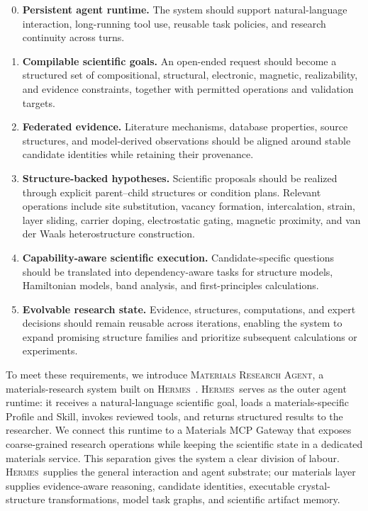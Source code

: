 \documentclass[11pt]{article}
\newcommand{\system}{\textsc{Materials Research Agent}}
\newcommand{\hermes}{\textsc{Hermes}}
\begin{document}
\begin{enumerate}[leftmargin=1.75em,label=\textbf{R\arabic*.},itemsep=0.45em]
    \setcounter{enumi}{-1}
    \item \textbf{Persistent agent runtime.}
    The system should support natural-language interaction, long-running tool use, reusable task policies, and research continuity across turns.

    \item \textbf{Compilable scientific goals.}
    An open-ended request should become a structured set of compositional, structural, electronic, magnetic, realizability, and evidence constraints, together with permitted operations and validation targets.

    \item \textbf{Federated evidence.}
    Literature mechanisms, database properties, source structures, and model-derived observations should be aligned around stable candidate identities while retaining their provenance.

    \item \textbf{Structure-backed hypotheses.}
    Scientific proposals should be realized through explicit parent--child structures or condition plans. Relevant operations include site substitution, vacancy formation, intercalation, strain, layer sliding, carrier doping, electrostatic gating, magnetic proximity, and van der Waals heterostructure construction.

    \item \textbf{Capability-aware scientific execution.}
    Candidate-specific questions should be translated into dependency-aware tasks for structure models, Hamiltonian models, band analysis, and first-principles calculations.

    \item \textbf{Evolvable research state.}
    Evidence, structures, computations, and expert decisions should remain reusable across iterations, enabling the system to expand promising structure families and prioritize subsequent calculations or experiments.
\end{enumerate}

To meet these requirements, we introduce \system, a materials-research system built on \hermes\ \cite{nousresearch2026hermes}. \hermes\ serves as the outer agent runtime: it receives a natural-language scientific goal, loads a materials-specific Profile and Skill, invokes reviewed tools, and returns structured results to the researcher. We connect this runtime to a Materials MCP Gateway that exposes coarse-grained research operations while keeping the scientific state in a dedicated materials service. This separation gives the system a clear division of labour. \hermes\ supplies the general interaction and agent substrate; our materials layer supplies evidence-aware reasoning, candidate identities, executable crystal-structure transformations, model task graphs, and scientific artifact memory.
\end{document}
